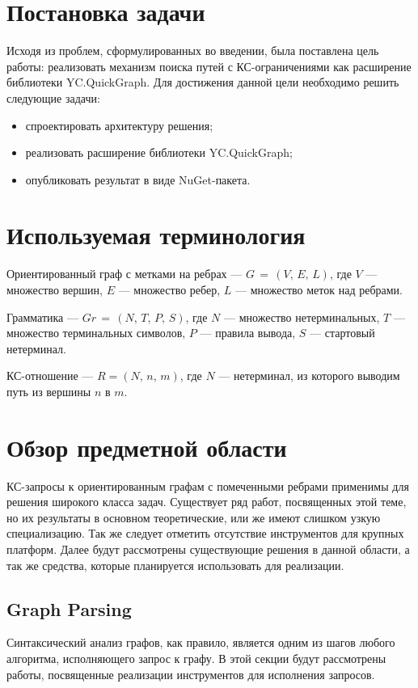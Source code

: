 \documentclass[14pt]{matmex-diploma-custom}
\begin{document}
\section{Постановка задачи}
    Исходя из проблем, сформулированных во введении, была поставлена цель работы: реализовать механизм поиска путей с КС-ограничениями как расширение библиотеки YC.QuickGraph. Для достижения данной цели необходимо решить следующие задачи:
	\begin{itemize}
	    \item спроектировать архитектуру решения;
        \item реализовать расширение библиотеки YC.QuickGraph;
        \item опубликовать результат в виде NuGet-пакета.
	\end{itemize}

\section{Используемая терминология}
	Ориентированный граф с метками на ребрах --- \(G\,=\,(V,\,E,\,L)\), где \(V\) --- множество вершин, \(E\) --- множество ребер, \(L\) --- множество меток над ребрами.
	
	Грамматика --- \(Gr\,=\,(N,\,T,\,P,\,S)\), где \(N\) --- множество нетерминальных, \(T\) --- множество терминальных символов, \(P\) --- правила вывода, \(S\) --- стартовый нетерминал.
	
	КС-отношение --- \(R = (N,\, n,\, m)\), где \(N\) --- нетерминал, из которого выводим путь из вершины \(n\) в \(m\). 

\section{Обзор предметной области}
	КС-запросы к ориентированным графам с помеченными ребрами применимы для решения широкого класса задач. Существует ряд работ, посвященных этой теме, но их результаты в основном теоретические, или же имеют слишком узкую специализацию. Так же следует отметить отсутствие инструментов для крупных платформ. Далее будут рассмотрены существующие решения в данной области, а так же средства, которые планируется использовать для реализации.
	\subsection{Graph Parsing}
	Синтаксический анализ графов, как правило, является одним из шагов любого алгоритма, исполняющего запрос к графу. В этой секции будут рассмотрены работы, посвященные реализации инструментов для исполнения запросов.
\end{document}
